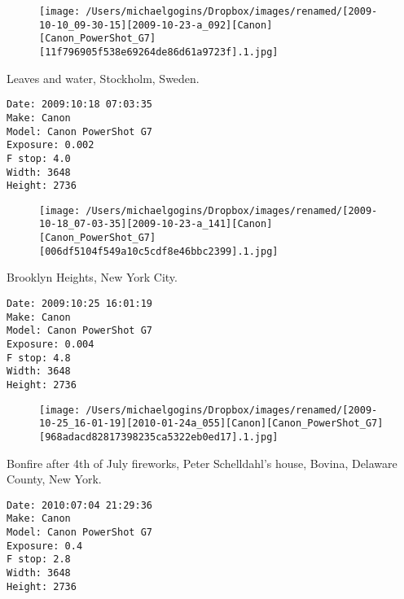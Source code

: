 \documentclass[11pt,letter,DIV=14,paper=landscape]{scrbook}
\begin{document}
\begin{figure}
\texttt{[image: /Users/michaelgogins/Dropbox/images/renamed/[2009-10-10\_09-30-15][2009-10-23-a\_092][Canon][Canon\_PowerShot\_G7][11f796905f538e69264de86d61a9723f].1.jpg]}
\end{figure}
    
\clearpage
\noindent Leaves and water, Stockholm, Sweden.
\noindent
\begin{lstlisting}
Date: 2009:10:18 07:03:35
Make: Canon
Model: Canon PowerShot G7
Exposure: 0.002
F stop: 4.0
Width: 3648
Height: 2736
\end{lstlisting}
\clearpage

\begin{figure}
\texttt{[image: /Users/michaelgogins/Dropbox/images/renamed/[2009-10-18\_07-03-35][2009-10-23-a\_141][Canon][Canon\_PowerShot\_G7][006df5104f549a10c5cdf8e46bbc2399].1.jpg]}
\end{figure}
    
\clearpage
\noindent Brooklyn Heights, New York City.
\noindent
\begin{lstlisting}
Date: 2009:10:25 16:01:19
Make: Canon
Model: Canon PowerShot G7
Exposure: 0.004
F stop: 4.8
Width: 3648
Height: 2736
\end{lstlisting}
\clearpage

\begin{figure}
\texttt{[image: /Users/michaelgogins/Dropbox/images/renamed/[2009-10-25\_16-01-19][2010-01-24a\_055][Canon][Canon\_PowerShot\_G7][968adacd82817398235ca5322eb0ed17].1.jpg]}
\end{figure}
    
\clearpage
\noindent Bonfire after 4th of July fireworks, Peter Schelldahl's house, Bovina, Delaware County, New York.
\noindent
\begin{lstlisting}
Date: 2010:07:04 21:29:36
Make: Canon
Model: Canon PowerShot G7
Exposure: 0.4
F stop: 2.8
Width: 3648
Height: 2736
\end{lstlisting}
\clearpage
\end{document}
